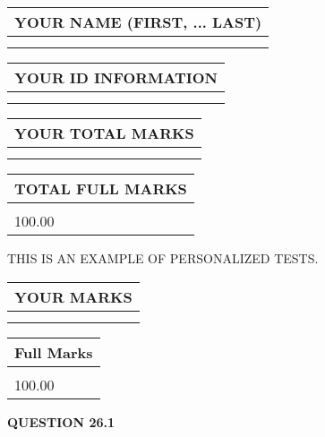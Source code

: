 \documentclass[12pt]{article}
\begin{document}
 
 
   
   
\newpage 
\setcounter{page}{ 
    26001 } 
   
   
   
   
\noindent\begin{tabular}{|l|}
\hline
YOUR NAME (FIRST, ... LAST)  \\
\hline
 \\ 
 \\ 
\hline
\end{tabular}
\hspace{0.05in} \begin{tabular}{|l|}
\hline
 YOUR   ID   INFORMATION  \\
\hline
 \\ 
 \\ 
\hline
\end{tabular}
   
   
\vspace{0.2in}\noindent\begin{tabular}{|l|}
\hline
YOUR TOTAL MARKS  \\
\hline
 \\ 
 \\ 
\hline
\end{tabular}
\hspace{0.05in} \begin{tabular}{|l|}
\hline
TOTAL FULL MARKS  \\
\hline
 \\ 
100.00 \\
\hline
\end{tabular}
   
   
 \vspace{0.2in}
{\Huge  THIS IS AN EXAMPLE OF}
{\Huge  PERSONALIZED TESTS. }
   
   
  
\vspace{0.2in}
  
\noindent\begin{tabular}{|l|}
\hline
 YOUR MARKS  \\
\hline
 \\ 
 \\ 
\hline
\end{tabular}
\hspace{0.05in} \begin{tabular}{|l|}
\hline
 Full Marks  \\
\hline
 \\ 
100.00 \\
\hline
\end{tabular}
{\textbf{\Large{QUESTION
26.1 
}}}
  
\end{document}
